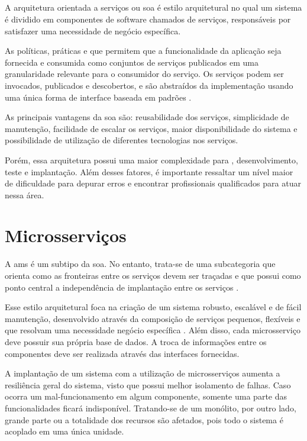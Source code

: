 \subsection{} 
A arquitetura orientada a serviços ou \acrfull{soa} é estilo arquitetural no qual um sistema é dividido em componentes de software chamados de serviços, responsáveis por satisfazer uma necessidade de negócio específica.

As políticas, práticas e  que permitem que a funcionalidade da aplicação seja fornecida e consumida como conjuntos de serviços publicados em uma granularidade relevante para o consumidor do serviço. Os serviços podem ser invocados, publicados e descobertos, e são abstraídos da implementação usando uma única forma de interface baseada em padrões \cite{understandingSOA}.

As principais vantagens da \acrshort{soa} são: reusabilidade dos serviços, simplicidade de manutenção, facilidade de escalar os serviços, maior disponibilidade do sistema e possibilidade de utilização de diferentes tecnologias nos serviços.

Porém, essa arquitetura possui uma maior complexidade para , desenvolvimento, teste e implantação. Além desses fatores, é importante ressaltar um nível maior de dificuldade para depurar erros e encontrar profissionais qualificados para atuar nessa área.

\section{Microsserviços} 
A \acrfull{ams} é um subtipo da \acrshort{soa}. No entanto, trata-se de uma subcategoria que orienta como as fronteiras entre os serviços devem ser traçadas e que possui como ponto central a independência de implantação entre os serviços \cite{buildingMicroservices}.

Esse estilo arquitetural foca na criação de um sistema robusto, escalável e de fácil manutenção, desenvolvido através da composição de serviços pequenos, flexíveis e que resolvam uma necessidade negócio específica \cite{buildingMicroservices}. Além disso, cada microsserviço deve possuir sua própria base de dados. A troca de informações entre os componentes deve ser realizada através das interfaces fornecidas.

A implantação de um sistema com a utilização de microsserviços aumenta a resiliência geral do sistema, visto que possui melhor isolamento de falhas. Caso ocorra um mal-funcionamento em algum componente, somente uma parte das funcionalidades ficará indisponível. Tratando-se de um monólito, por outro lado, grande parte ou a totalidade dos recursos são afetados, pois todo o sistema é acoplado em uma única unidade.

